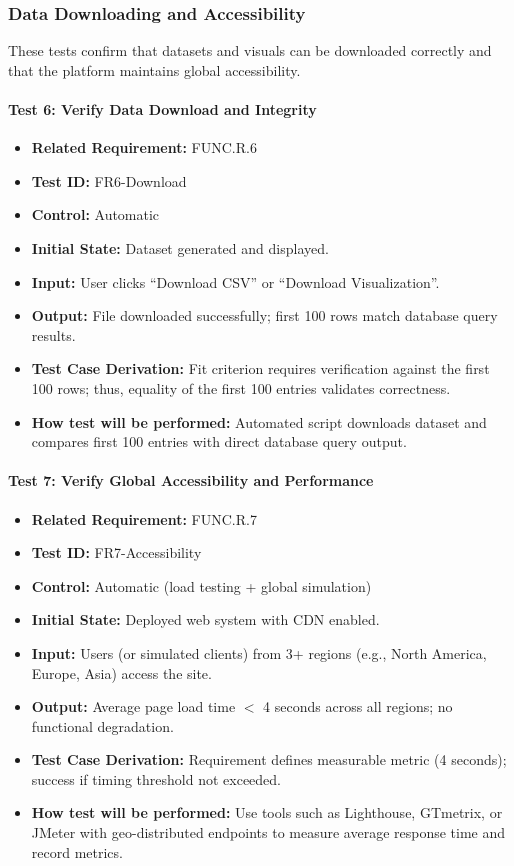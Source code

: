 \documentclass[12pt, titlepage]{article}
\begin{document}
\subsubsection{Data Downloading and Accessibility}

These tests confirm that datasets and visuals can be downloaded correctly and that the platform maintains global accessibility.

\paragraph{Test 6: Verify Data Download and Integrity}
\begin{itemize}
    \item \textbf{Related Requirement:} FUNC.R.6
    \item \textbf{Test ID:} FR6-Download
    \item \textbf{Control:} Automatic
    \item \textbf{Initial State:} Dataset generated and displayed.
    \item \textbf{Input:} User clicks ``Download CSV'' or ``Download Visualization''.
    \item \textbf{Output:} File downloaded successfully; first 100 rows match database query results.
    \item \textbf{Test Case Derivation:} Fit criterion requires verification against the first 100 rows; thus, equality of the first 100 entries validates correctness.
    \item \textbf{How test will be performed:} Automated script downloads dataset and compares first 100 entries with direct database query output.
\end{itemize}

\paragraph{Test 7: Verify Global Accessibility and Performance}
\begin{itemize}
    \item \textbf{Related Requirement:} FUNC.R.7
    \item \textbf{Test ID:} FR7-Accessibility
    \item \textbf{Control:} Automatic (load testing + global simulation)
    \item \textbf{Initial State:} Deployed web system with CDN enabled.
    \item \textbf{Input:} Users (or simulated clients) from 3+ regions (e.g., North America, Europe, Asia) access the site.
    \item \textbf{Output:} Average page load time $<$ 4 seconds across all regions; no functional degradation.
    \item \textbf{Test Case Derivation:} Requirement defines measurable metric (4 seconds); success if timing threshold not exceeded.
    \item \textbf{How test will be performed:} Use tools such as Lighthouse, GTmetrix, or JMeter with geo-distributed endpoints to measure average response time and record metrics.
\end{itemize}
\end{document}

